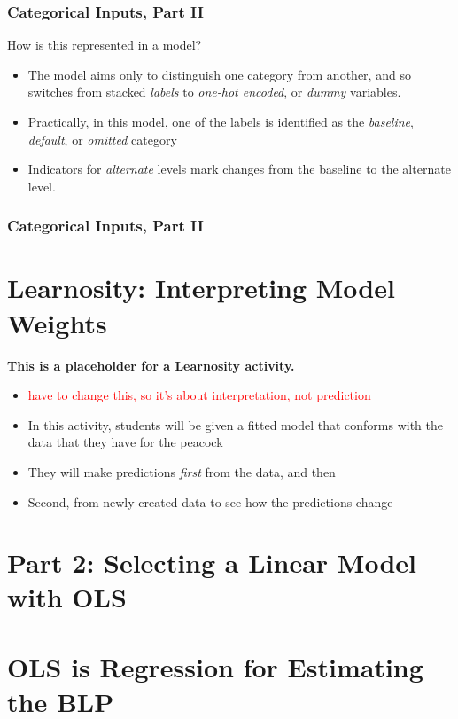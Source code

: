 \documentclass[12pt, block=fill]{beamer}
\newcommand{\paul}[1]{\textcolor{red}{#1}}
\begin{document}
\begin{frame}
  \frametitle{Categorical Inputs, Part II}
  How is this represented in a model?
  \begin{itemize}
    \item The model aims only to distinguish one category from another, and so switches from stacked \textit{labels} to \textit{one-hot encoded}, or \textit{dummy} variables.
    \item Practically, in this model, one of the labels is identified as the \textit{baseline}, \textit{default}, or \textit{omitted} category
    \item Indicators for \textit{alternate} levels mark changes from the baseline to the alternate level. 
  \end{itemize}
\end{frame}

\begin{frame}
  \frametitle{Categorical Inputs, Part II}

\end{frame} 

\section{Learnosity: Interpreting Model Weights}

\begin{frame}
  \textbf{This is a placeholder for a Learnosity activity.}

  \begin{itemize}
  \item \paul{have to change this, so it's about interpretation, not prediction}
  \item In this activity, students will be given a fitted model that
    conforms with the data that they have for the peacock
  \item They will make predictions \textit{first} from the data,
    and then
  \item Second, from newly created data to see how the predictions
    change
  \end{itemize} 
\end{frame}

\section{Part 2: Selecting a Linear Model with OLS}

\section{OLS is Regression for Estimating the BLP}
\end{document}

